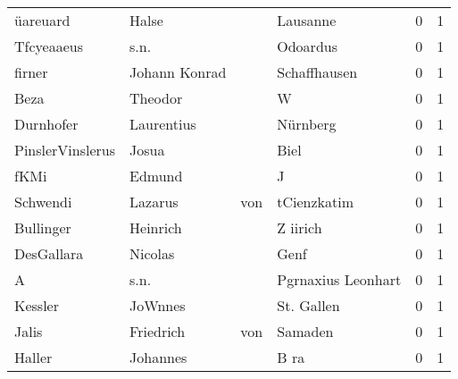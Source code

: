 \begin{tabular}{llllrr}
                 üareuard &                              Halse &             &                                    Lausanne &          0 &         1 \\
               Tfcyeaaeus &                               s.n. &             &                                    Odoardus &          0 &         1 \\
                   firner &                      Johann Konrad &             &                                Schaffhausen &          0 &         1 \\
                     Beza &                            Theodor &             &                                           W &          0 &         1 \\
                Durnhofer &                         Laurentius &             &                                    Nürnberg &          0 &         1 \\
         PinslerVinslerus &                              Josua &             &                                        Biel &          0 &         1 \\
                     fKMi &                             Edmund &             &                                           J &          0 &         1 \\
                 Schwendi &                            Lazarus &         von &                                 tCienzkatim &          0 &         1 \\
                Bullinger &                           Heinrich &             &                                    Z iirich &          0 &         1 \\
               DesGallara &                            Nicolas &             &                                        Genf &          0 &         1 \\
                        A &                               s.n. &             &                          Pgrnaxius Leonhart &          0 &         1 \\
                  Kessler &                            JoWnnes &             &                                  St. Gallen &          0 &         1 \\
                    Jalis &                          Friedrich &         von &                                     Samaden &          0 &         1 \\
                   Haller &                           Johannes &             &                                        B ra &          0 &         1 \\

\end{tabular}
